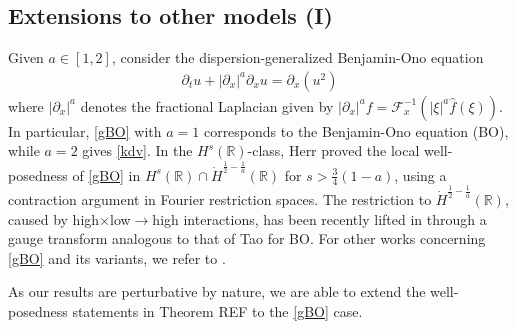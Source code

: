 \documentclass[a4paper,
11pt,  reqno]{amsart}
\newcommand{\5}{\textup{V}}
\newcommand{\ft}{\widehat}
\newcommand{\dx}{\partial_x}
\newcommand{\dt}{\partial_t}
\theoremstyle{remark}
\newcommand{\R}{\mathbb{R}}
\newcommand{\Ft}{{\mathcal{F}}}
\numberwithin{equation}{section}
\numberwithin{theorem}{section}
\begin{document}
\subsection{Extensions to other models (I)}
\label{sec:dgbo}

Given $a \in [1,2]$, consider the dispersion-generalized Benjamin-Ono equation
\begin{align}
\label{gBO}\tag{dgBO}
\dt u + |\dx|^a \dx u = \dx (u^2)
\end{align}
where $|\dx|^a$ denotes the fractional Laplacian given by $|\dx|^a f = \Ft_{x}^{-1} (|\xi|^a \ft f (\xi))$.
In particular, \eqref{gBO} with $a=1$ corresponds to the Benjamin-Ono equation (BO), while $a=2$ gives \eqref{kdv}. In the $H^s(\R)$-class, Herr \cite{herr_bo} proved the local well-posedness of \eqref{gBO} in $H^s (\R) \cap \dot H^{\frac12-\frac 1a}(\R)$ for $s>\frac{3}{4}(1-a)$, using a contraction argument in Fourier restriction spaces. The restriction to $\dot H^{\frac12-\frac 1a}(\R)$, caused by high$\times$low$\to$high interactions, has been recently lifted in \cite{AiLiu} through a gauge transform analogous to that of Tao \cite{tao_bo} for BO. For other works concerning \eqref{gBO} and its variants, we refer to \cite{CamposLinaresSantos, FarahLinaresPastor_bo, Jockel, KenigMartelRobbiano}.

As our results are perturbative by nature, we are able to extend the well-posedness statements in Theorem REF to the \eqref{gBO} case.
\end{document}
